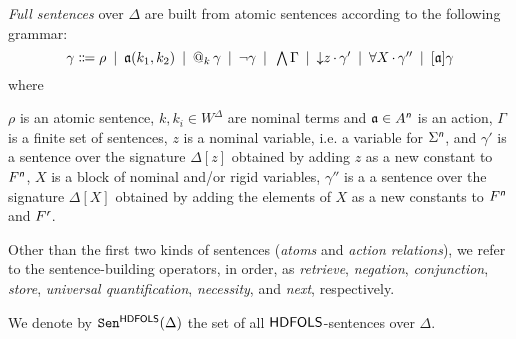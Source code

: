 \documentclass[a4paper,UKenglish,cleveref,autoref]{lipics-v2019}
\begin{document}
\emph{Full sentences}\label{sentence-building-operators} over $\Delta$ are built from atomic sentences according to the following grammar:
\[
  \gamma \Coloneqq
  \rho \enspace|\enspace
  \mathfrak{a}(k_{1}, k_{2}) \enspace|\enspace
  @_{k}\, \gamma \enspace|\enspace
  \lnot \gamma \enspace|\enspace
  \textstyle\bigwedge \Gamma \enspace|\enspace
  {\downarrow}z\,{\cdot}\, \gamma' \enspace|\enspace
  \forall X\,{\cdot}\, \gamma'' \enspace|\enspace
  [\mathfrak{a}] \gamma
\]
where 
\begin{inparenum}
 \inparitem $\rho$ is an atomic sentence,
 \inparitem $k, k_{i} \in W^\Delta $ are nominal terms and $\mathfrak{a} \in A^{\text{\normalfont\sffamily\itshape n}}$ is an action,
 \inparitem $\Gamma$ is a finite set of sentences,
 \inparitem $z$ is a nominal variable, i.e. a variable for $\Sigma^{\text{\normalfont\sffamily\itshape n}}$, and $\gamma'$ is a sentence over the signature $\Delta[z]$ obtained by adding $z$ as a new constant to $F^{\text{\normalfont\sffamily\itshape n}}$,
 \inparitem $X$ is a block of nominal and/or rigid variables,
$\gamma''$ is a a sentence over the signature $\Delta[X]$ obtained by adding the elements of $X$ as a new constants to $F^{\text{\normalfont\sffamily\itshape n}}$ and $F^{\text{\normalfont\sffamily\itshape r}}$.
 \end{inparenum}
Other than the first two kinds of sentences (\emph{atoms} and \emph{action relations}), we refer to the sentence-building operators, in order, as \emph{retrieve}, \emph{negation}, \emph{conjunction}, \emph{store}, \emph{universal quantification}, \emph{necessity}, and \emph{next}, respectively.

We denote by $\mathtt{Sen}^{{\mathsf{HDFOLS}}}(\Delta)$ the set of all ${\mathsf{HDFOLS}}$-sentences over $\Delta$.
\end{document}
